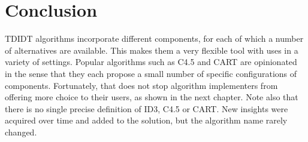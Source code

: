 \section{Conclusion}
TDIDT algorithms incorporate different components, for each of which a number of alternatives are available. This makes them a very flexible tool with uses in a variety of settings. Popular algorithms such as C4.5 and CART are opinionated in the sense that they each propose a small number of specific configurations of components. Fortunately, that does not stop algorithm implementers from offering more choice to their users, as shown in the next chapter. Note also that there is no single precise definition of ID3, C4.5 or CART. New insights were acquired over time and added to the solution, but the algorithm name rarely changed.